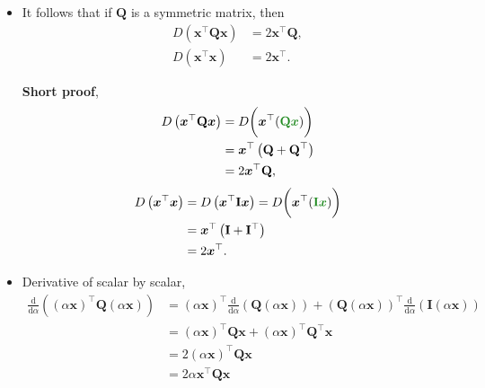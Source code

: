 \documentclass[12pt,thmsa]{article}
\begin{document}
\begin{itemize}
	\item It follows that if \(\mathbf{Q}\) is a symmetric matrix, then
	\[ \begin{aligned}
		D\left(\boldsymbol{x}^{\top} \mathbf{Q} \boldsymbol{x}\right) &=2 \boldsymbol{x}^{\top} \mathbf{Q}, \\
		D\left(\boldsymbol{x}^{\top} \boldsymbol{x}\right) &=2 \boldsymbol{x}^{\top}.
	\end{aligned}
	\]
	
	\textbf{Short proof},
	\[ \begin{aligned}    
		D\left(\boldsymbol{x}^{\top} \mathbf{Q} \boldsymbol{x}\right)    
		&=D \bigg( \boldsymbol{x}^{\top}( {\color{forestgreen}{\mathbf{Q} \boldsymbol{x}}} ) \bigg) \\
		&=\boldsymbol{x}^{\top} \left(\mathbf{Q}+\mathbf{Q}^{\top}\right) \\
		&=2 \boldsymbol{x}^{\top} \mathbf{Q},
	\end{aligned} \]
	\[ \begin{aligned}    
		D\left(\boldsymbol{x}^{\top}  \boldsymbol{x}\right)
		&=D\left(\boldsymbol{x}^{\top} \mathbf{I} \boldsymbol{x}\right) 
		=D \bigg( \boldsymbol{x}^{\top}( {\color{forestgreen}{\mathbf{I} \boldsymbol{x}}} ) \bigg) \\
		&=\boldsymbol{x}^{\top} \left(\mathbf{I}+\mathbf{I}^{\top}\right) \\
		&=2 \boldsymbol{x}^{\top}.
	\end{aligned} \]

	\item Derivative of scalar by scalar,
	\[\begin{aligned}
		\frac{\mathrm{d}}{\mathrm{d} \alpha}\left((\alpha \boldsymbol{x})^{\top} \mathbf{Q}(\alpha \boldsymbol{x})\right) 
		&=(\alpha \boldsymbol{x})^{\top} \frac{\mathrm{d}}{\mathrm{d} \alpha}(\mathbf{Q}(\alpha \boldsymbol{x}))
		+(\mathbf{Q}(\alpha \boldsymbol{x}))^{\top} \frac{\mathrm{d}}{\mathrm{d} \alpha}(\mathbf{I}(\alpha \boldsymbol{x})) \\
		& =(\alpha \boldsymbol{x})^{\top} \mathbf{Q} \boldsymbol{x}+(\alpha \boldsymbol{x})^{\top} \mathbf{Q}^{\top} \boldsymbol{x} \\
		& = 2 (\alpha \boldsymbol{x})^{\top} \mathbf{Q} \boldsymbol{x} \\
		& = 2 \alpha \boldsymbol{x}^{\top} \mathbf{Q} \boldsymbol{x} \\
	\end{aligned}
	\]
\end{itemize}
\end{document}
